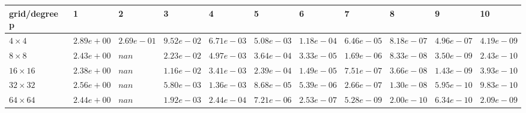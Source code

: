 \begin{tabular}{lllllllllll}
\hline
 grid/degree p   & 1          & 2          & 3          & 4          & 5          & 6          & 7          & 8          & 9          & 10         \\
\hline
 $4 \times 4$    & $2.89e+00$ & $2.69e-01$ & $9.52e-02$ & $6.71e-03$ & $5.08e-03$ & $1.18e-04$ & $6.46e-05$ & $8.18e-07$ & $4.96e-07$ & $4.19e-09$ \\
 $8 \times 8$    & $2.43e+00$ & $nan$      & $2.23e-02$ & $4.97e-03$ & $3.64e-04$ & $3.33e-05$ & $1.69e-06$ & $8.33e-08$ & $3.50e-09$ & $2.43e-10$ \\
 $16 \times 16$  & $2.38e+00$ & $nan$      & $1.16e-02$ & $3.41e-03$ & $2.39e-04$ & $1.49e-05$ & $7.51e-07$ & $3.66e-08$ & $1.43e-09$ & $3.93e-10$ \\
 $32 \times 32$  & $2.56e+00$ & $nan$      & $5.80e-03$ & $1.36e-03$ & $8.68e-05$ & $5.39e-06$ & $2.66e-07$ & $1.30e-08$ & $5.95e-10$ & $9.83e-10$ \\
 $64 \times 64$  & $2.44e+00$ & $nan$      & $1.92e-03$ & $2.44e-04$ & $7.21e-06$ & $2.53e-07$ & $5.28e-09$ & $2.00e-10$ & $6.34e-10$ & $2.09e-09$ \\
\hline
\end{tabular}
